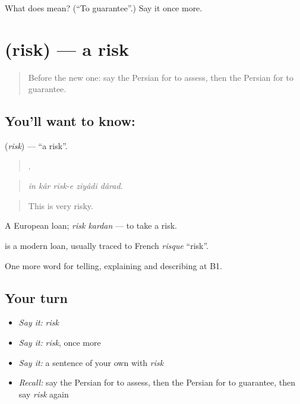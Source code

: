 \begin{tcolorbox}[breakable,colback=teal!4,colframe=teal!35!black,title={Before you move on}]
What does   mean? (\textquotedblleft{}To guarantee\textquotedblright{}.) Say it once more.
\end{tcolorbox}
\section[\texorpdfstring{\fa{ریسک} (risk)}{ریسک (risk)}]{ (risk) — a risk}

\label{lesson:FA-C394-risk}



\begin{quote}
Before the new one: say the Persian for to assess, then the Persian for to guarantee.
\end{quote}

\subsection*{You'll want to know: }
\textbf{} (\emph{risk}) — \textquotedblleft{}a risk\textquotedblright{}.

\begin{quote}
    .
\end{quote}

\begin{quote}
\emph{in kâr risk-e ziyâdi dârad.}
\end{quote}

\begin{quote}
This is very risky.
\end{quote}

A European loan; \emph{risk kardan} — to take a risk.

\begin{cousinweb}
\textbf{} is a modern loan, usually traced to French \emph{risque} \textquotedblleft{}risk\textquotedblright{}.
\end{cousinweb}

\begin{grammarlens}[title={What you've built}]
One more word for telling, explaining and describing at B1.
\end{grammarlens}

\subsection*{Your turn}
\begin{itemize}
\raggedright
  \item \emph{Say it:} \emph{risk}
  \item \emph{Say it:} \emph{risk}, once more
  \item \emph{Say it:} a sentence of your own with \emph{risk}
  \item \emph{Recall:} say the Persian for to assess, then the Persian for to guarantee, then say \emph{risk} again
\end{itemize}

